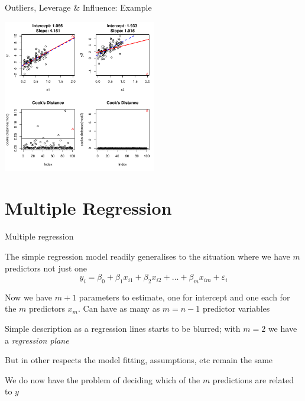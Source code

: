 \documentclass[10pt,ignorenonframetext,compress, aspectratio=169]{beamer}
\begin{document}
\begin{frame}{Outliers, Leverage \& Influence: Example}

\begin{center}\includegraphics[width=0.5\textwidth]{03-linear-models_files/figure-beamer/leverge-influence-example-1} \end{center}

\end{frame}

\section{Multiple Regression}\label{multiple-regression}

\begin{frame}{Multiple regression}

The simple regression model readily generalises to the situation where
we have \(m\) predictors not just one
\[y_i = \beta_0 + \beta_1x_{i1} + \beta_2x_{i2} + \dots + \beta_mx_{im} + \varepsilon_i\]

Now we have \(m + 1\) parameters to estimate, one for intercept and one
each for the \(m\) predictors \(x_m\). Can have as many as \(m = n - 1\)
predictor variables

Simple description as a regression lines starts to be blurred; with
\(m = 2\) we have a \emph{regression plane}

But in other respects the model fitting, assumptions, etc remain the
same

We do now have the problem of deciding which of the \(m\) predictions
are related to \(y\)

\end{frame}
\end{document}
